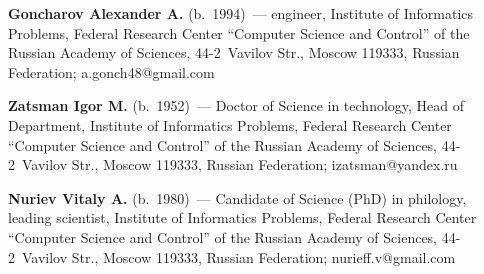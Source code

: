   \vspace*{3pt}
  
  \noindent
  \textbf{Goncharov Alexander A.} (b.\ 1994)~--- engineer, Institute of Informatics Problems, 
Federal Research Center ``Computer Science and Control'' of the Russian Academy of Sciences, 
44-2~Vavilov Str., Moscow 119333, Russian Federation; \mbox{a.gonch48@gmail.com}
  
  \vspace*{3pt}
  
  
  \noindent
  \textbf{Zatsman Igor M.} (b.\ 1952)~--- Doctor of Science in technology, Head of Department, 
Institute of Informatics Problems, Federal Research Center ``Computer Science and Control'' of the 
Russian Academy of Sciences, 44-2~Vavilov Str., Moscow 119333, Russian Federation; 
\mbox{izatsman@yandex.ru}
  
  \vspace*{3pt}
  
  
  \noindent
  \textbf{Nuriev Vitaly A.} (b.\ 1980)~--- Candidate of Science (PhD) in philology, leading 
scientist, Institute of Informatics Problems, Federal Research Center ``Computer Science and 
Control'' of the Russian Academy of Sciences, 44-2~Vavilov Str., Moscow 119333, Russian 
Federation; \mbox{nurieff.v@gmail.com}
 
\label{end\stat}

\renewcommand{\bibname}{\protect\rm Литература} 